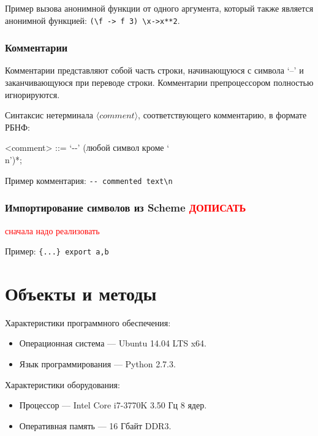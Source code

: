 \documentclass[12pt,a4paper,oneside]{extarticle}
\begin{document}
            Пример вызова анонимной функции от одного аргумента, который также является анонимной функцией: \lstinline$(\f -> f 3) \x->x**2$.

        \subsubsection{Комментарии}
            Комментарии представляют собой часть строки, начинающуюся с символа `--' и заканчивающуюся при переводе строки. Комментарии препроцессором полностью игнорируются.

            Синтаксис нетерминала $\langle comment \rangle$, соответствующего комментарию, в формате РБНФ:

            \begin{grammar}
                <comment> ::= `-\null-' (любой символ кроме `\\n')*;
            \end{grammar}

            Пример комментария: \lstinline$-- commented text\n$
            

        \subsubsection{Импортирование символов из Scheme \textcolor{red}{ДОПИСАТЬ}}
            \textcolor{red}{сначала надо реализовать}

            Пример: \lstinline${...} export a,b$
        
\clearpage

\section{Объекты и методы}
\label{sec:configuration} 
    \noindent Характеристики программного обеспечения:
    \begin{itemize}
        \item Операционная система --- Ubuntu 14.04 LTS x64.
        \item Язык программирования --- Python 2.7.3.
    \end{itemize}
    
    \noindent Характеристики оборудования:
    \begin{itemize}
        \item Процессор --- Intel Core i7-3770K 3.50 Гц 8 ядер.
        \item Оперативная память --- 16 Гбайт DDR3.
    \end{itemize}
\clearpage
\end{document}
